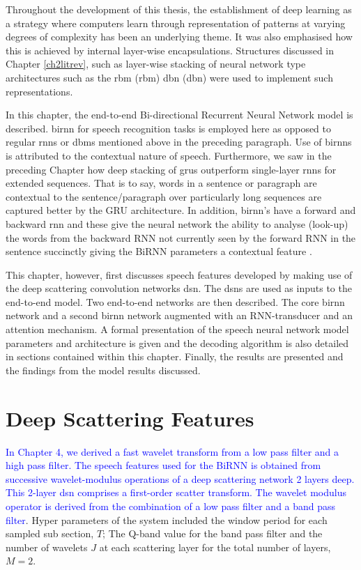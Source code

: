 \startblue
Throughout the development of this thesis, the establishment of deep learning as a strategy where computers learn through representation of patterns at varying degrees of complexity has been an underlying theme.  It was also emphasised how this is achieved by internal layer-wise encapsulations. Structures discussed in Chapter \ref{ch2litrev}, such as layer-wise stacking of neural network type architectures such as the \acrlong{rbm} (\acrshort{rbm}) \acrlong{dbn} (\acrshort{dbn}) were used to implement such representations.  

In this chapter, the end-to-end Bi-directional Recurrent Neural Network model is described.  \acrshort{birnn} for speech recognition tasks is  employed here as opposed to regular \acrshort{rnn}s or \acrshort{dbm}s mentioned above in the preceding paragraph.  Use of \acrshort{birnn}s is attributed to the contextual nature of speech.  Furthermore, we saw in the preceding Chapter how deep stacking of \acrshort{gru}s outperform single-layer \acrshort{rnn}s for extended sequences. That is to say, words in a sentence or paragraph are contextual to the sentence/paragraph over particularly long sequences are captured better by the GRU architecture.  In addition, \acrshort{birnn}'s have a forward and backward \acrshort{rnn} and these give the neural network the ability to analyse (look-up) the words from the backward RNN not currently seen by the forward RNN in the sentence succinctly giving the BiRNN parameters a contextual feature \citep{graves2006connectionist}.  

This chapter, however, first discusses speech features developed by making use of the deep scattering convolution networks \acrshort{dsn}.  The \acrshort{dsn}s are used as inputs to the end-to-end model.  Two end-to-end networks are then described.  The core \acrshort{birnn} network and a second \acrshort{birnn} network augmented with an RNN-transducer and an attention mechanism. A formal presentation of the speech neural network model parameters and architecture is given and the decoding algorithm is also detailed in sections contained within this chapter.  Finally, the results are presented and the findings from the model results discussed.\stopblue

\section{Deep Scattering Features}\label{sec_c7_wparams}
\textcolor{blue}{In Chapter 4, we derived a fast wavelet transform from a low pass filter and a high pass filter.  The speech features used for the BiRNN is obtained from successive wavelet-modulus operations of a deep scattering network 2 layers deep.  This 2-layer \acrshort{dsn} comprises a first-order scatter transform. The wavelet modulus operator is derived from the combination of a low pass filter and a band pass filter}.  Hyper parameters of the system included the window period for each sampled sub section, $T$;  The Q-band value for the band pass filter and the number of wavelets $J$ at each scattering layer for the total number of layers, $M=2$.

